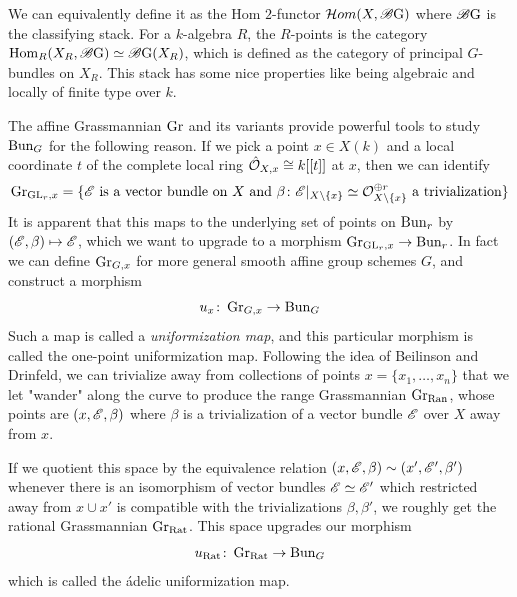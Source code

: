 \documentclass[12pt]{article}
\begin{document}
We can equivalently define it as the Hom $2$-functor $\mathcal{H} om(X, \operatorname{\mathscr{B} G})$ where $\operatorname{\mathscr{B} G}$ is the classifying stack. For a $k$-algebra $R$, the $R$-points is the category $\operatorname{Hom}_R(X_R, \operatorname{\mathscr{B} G}) \simeq \operatorname{\mathscr{B} G}(X_R)$, which is defined as the category of principal $G$-bundles on $X_R$. This stack has some nice properties like being algebraic and locally of finite type over $k$.

The affine Grassmannian $\operatorname{Gr}$ and its variants provide powerful tools to study $\operatorname{Bun}_G$ for the following reason. If we pick a point $x \in X(k)$ and a local coordinate $t$ of the complete local ring $\hat{\mathcal{O}}_{X,x} \cong k[[t]]$ at $x$, then we can identify
\[\operatorname{Gr}_{\operatorname{GL}_r, x} = \{\mathscr{E} \text{ is a vector bundle on } X \text{ and } \beta \colon \mathscr{E}\vert_{X\setminus \{x\}} \simeq \mathcal{O}^{\oplus r}_{X\setminus \{x\}} \text{ a trivialization}\}\]
It is apparent that this maps to the underlying set of points on $\operatorname{Bun}_r$ by $(\mathscr{E}, \beta) \mapsto \mathscr{E}$, which we want to upgrade to a morphism $\operatorname{Gr}_{\operatorname{GL}_r, x} \to \operatorname{Bun}_r$. In fact we can define $\operatorname{Gr}_{G,x}$ for more general smooth affine group schemes $G$, and construct a morphism
\[u_x \colon \operatorname{Gr}_{G,x} \rightarrow \operatorname{Bun}_G\]
Such a map is called a \textit{uniformization map}, and this particular morphism is called the one-point uniformization map. Following the idea of Beilinson and Drinfeld, we can trivialize away from collections of points $x = \{x_1,\ldots,x_n\}$ that we let "wander" along the curve to produce the range Grassmannian $\operatorname{Gr}_{\mathrm{Ran}}$, whose points are $(x, \mathscr{E}, \beta)$ where $\beta$ is a trivialization of a vector bundle $\mathscr{E}$ over $X$ away from $x$.

If we quotient this space by the equivalence relation $(x,\mathscr{E}, \beta) \sim (x', \mathscr{E}', \beta')$ whenever there is an isomorphism of vector bundles $\mathscr{E} \simeq \mathscr{E}'$ which restricted away from $x \cup x'$ is compatible with the trivializations $\beta, \beta'$, we roughly get the rational Grassmannian $\operatorname{Gr}_{\mathrm{Rat}}$. This space upgrades our morphism
\[u_{\mathrm{Rat}} \colon \operatorname{Gr}_{\mathrm{Rat}} \rightarrow \operatorname{Bun}_G\]
which is called the \'adelic uniformization map.
\end{document}
